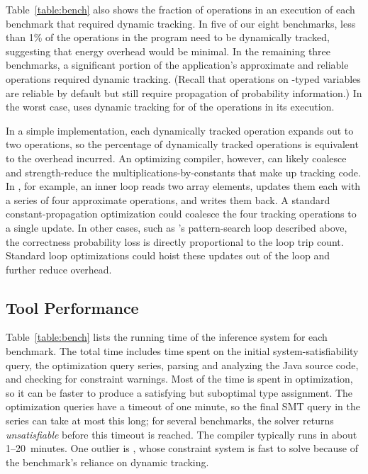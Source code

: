 {Table~\ref{table:bench} also shows the fraction of operations in an execution
of each benchmark that required dynamic tracking.
In five of our eight benchmarks, less than 1\% of the operations in the
program need to be dynamically tracked, suggesting that energy overhead would
be minimal.
In the remaining three benchmarks, a significant portion of the application's
approximate and reliable operations required dynamic tracking.
(Recall that operations on -typed variables are reliable by default
but still require propagation of probability information.)
In the worst case,  uses dynamic tracking for  of
the operations in its execution.

In a simple implementation, each dynamically tracked operation expands out to
two operations, so
the percentage of dynamically tracked operations is equivalent to the
overhead incurred.
An optimizing compiler, however, can likely coalesce and strength-reduce the
multiplications-by-constants that make up tracking code.
In , for example, an inner loop reads two array elements, updates
them each with a series of four approximate operations, and writes them back.
A standard constant-propagation optimization could coalesce the four tracking
operations to a single update.
In other cases, such as 's pattern-search loop described above,
the correctness probability loss is directly proportional to the loop trip
count.
Standard loop optimizations could hoist these updates out of the loop and
further reduce overhead.


\subsection{Tool Performance}

Table~\ref{table:bench} lists the running time of the inference system for
each benchmark.
The total time includes time spent on the initial system-satisfiability query,
the optimization query series, parsing and analyzing the Java
source code, and checking for \lang constraint warnings.
Most of the time is spent in optimization, so it can be faster to produce a
satisfying but suboptimal type assignment.
The optimization queries have a timeout of one minute, so the final SMT query
in the series can take at most this long; for several benchmarks, the solver
returns \emph{unsatisfiable} before this timeout is reached.
The compiler typically runs in about 1--20~minutes.
One outlier is , whose constraint system is fast to solve because of
the benchmark's reliance on dynamic tracking.

}
